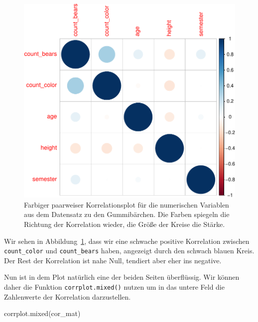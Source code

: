 \documentclass[
  letterpaper,
]{scrbook}
\newenvironment{Shaded}{\begin{snugshade}}{\end{snugshade}}
\newcommand{\FunctionTok}[1]{\textcolor[rgb]{0.28,0.35,0.67}{#1}}
\newcommand{\NormalTok}[1]{\textcolor[rgb]{0.00,0.23,0.31}{#1}}
\begin{document}
\begin{figure}[H]

{\centering \includegraphics{./stat-linear-reg-corr_files/figure-pdf/fig-corrplot-01-1.pdf}

}

\caption{\label{fig-corrplot-01}Farbiger paarweiser Korrelationsplot für
die numerischen Variablen aus dem Datensatz zu den Gummibärchen. Die
Farben spiegeln die Richtung der Korrelation wieder, die Größe der
Kreise die Stärke.}

\end{figure}

Wir sehen in Abbildung~\ref{fig-corrplot-01}, dass wir eine schwache
positive Korrelation zwischen \texttt{count\_color} und
\texttt{count\_bears} haben, angezeigt durch den schwach blauen Kreis.
Der Rest der Korrelation ist nahe Null, tendiert aber eher ins negative.

Nun ist in dem Plot natürlich eine der beiden Seiten überflüssig. Wir
können daher die Funktion \texttt{corrplot.mixed()} nutzen um in das
untere Feld die Zahlenwerte der Korrelation darzustellen.

\begin{Shaded}
\begin{Highlighting}[]
\FunctionTok{corrplot.mixed}\NormalTok{(cor\_mat)}
\end{Highlighting}
\end{Shaded}
\end{document}
